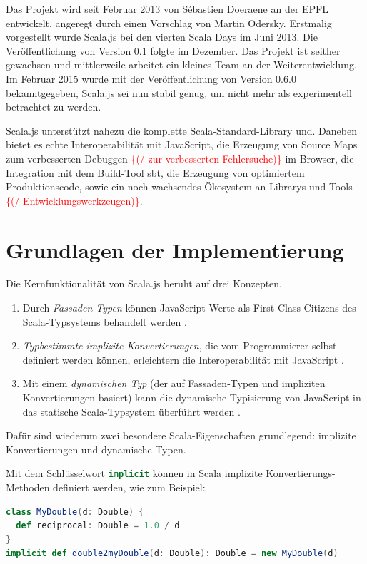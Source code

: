 \documentclass[a4paper, 12pt, hidelinks, listof=totoc, listoftables=totoc, bibliography=totoc]{scrreprt}
\newcommand{\scala}[1]{\lstinline[language=Scala, style=inline]|#1|}
\newcommand{\TODOi}[1]{\textcolor{red}{\{#1\}}}
\begin{document}
Das Projekt wird seit Februar 2013 von Sébastien Doeraene an der \ac{EPFL} entwickelt, angeregt durch einen Vorschlag von Martin Odersky.\cite{doeraene2013.CSJ} Erstmalig vorgestellt wurde Scala.js bei den vierten Scala Days im Juni 2013. Die Veröffentlichung von Version 0.1 folgte im Dezember. Das Projekt ist seither gewachsen und mittlerweile arbeitet ein kleines Team an der Weiterentwicklung. Im Februar 2015 wurde mit der Veröffentlichung von Version 0.6.0 bekanntgegeben, Scala.js sei nun stabil genug, um nicht mehr als experimentell betrachtet zu werden.\cite{doeraene2015.SNL}

Scala.js unterstützt nahezu die komplette Scala-Standard-Library und. Daneben bietet es echte Interoperabilität mit JavaScript, die Erzeugung von Source Maps zum verbesserten Debuggen \TODOi{(/ zur verbesserten Fehlersuche)} im Browser, die Integration mit dem Build-Tool sbt, die Erzeugung von optimiertem Produktionscode, sowie ein noch wachsendes Ökosystem an Librarys und Tools \TODOi{(/ Entwicklungswerkzeugen)}.


\section{Grundlagen der Implementierung}

Die Kernfunktionalität von Scala.js beruht auf drei Konzepten.
\begin{enumerate}
	\item Durch \emph{Fassaden-Typen} können JavaScript-Werte als First-Class-Citizens des Scala-Typsystems behandelt werden \cite[S. 4]{doeraene2013.TDI}.
	\item \emph{Typbestimmte implizite Konvertierungen}, die vom Programmierer selbst definiert werden können, erleichtern die Interoperabilität mit JavaScript \cite[S. 5]{doeraene2013.TDI}.
	\item Mit einem \emph{dynamischen Typ} (der auf Fassaden-Typen und impliziten Konvertierungen basiert) kann die dynamische Typisierung von JavaScript in das statische Scala-Typsystem überführt werden \cite[S. 6]{doeraene2013.TDI}.
\end{enumerate}

Dafür sind wiederum zwei besondere Scala-Eigenschaften grundlegend: implizite Konvertierungen und dynamische Typen.

Mit dem Schlüsselwort \scala{implicit} können in Scala implizite Konvertierungs-Methoden definiert werden, wie zum Beispiel:
\begin{lstlisting}[language=Scala, style=snippet]
class MyDouble(d: Double) {
  def reciprocal: Double = 1.0 / d
}
implicit def double2myDouble(d: Double): Double = new MyDouble(d)
\end{lstlisting}
\end{document}
